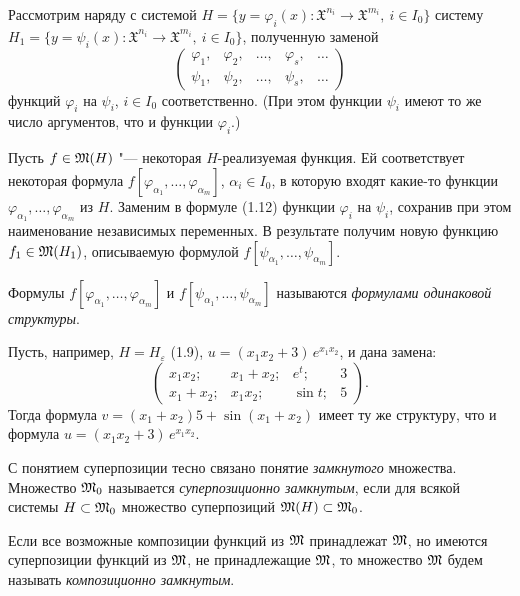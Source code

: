 Рассмотрим наряду с системой
$H=\{y=\varphi_i(x)\colon\mathfrak X^{n_i}\to\mathfrak X^{m_i},\ i\in I_0\}$
систему
$H_1=\{y=\psi_i(x)\colon\mathfrak X^{n_i}\to\mathfrak X^{m_i},\ i\in I_0\}$,
полученную заменой
\begin{equation}\tag{1.12}
\begin{pmatrix}\varphi_1,&\varphi_2,&\dots,&\varphi_s,&\dots\\ \psi_1,&\psi_2,&\dots,&\psi_s,&\dots\end{pmatrix}
\end{equation}
функций $\varphi_i$ на $\psi_i$, $i\in I_0$ соответственно. (При этом
функции $\psi_i$ имеют то же число аргументов, что и функции $\varphi_i$.)

Пусть $f\in\mathfrak M(H)$ "--- некоторая $H$-реализуемая функция. Ей соответствует
некоторая формула $f[\varphi_{\alpha_1},\dots,\varphi_{\alpha_m}]$,
$\alpha_i\in I_0$, в которую входят какие-то
функции $\varphi_{\alpha_1},\dots,\varphi_{\alpha_m}$ из $H$. Заменим
в формуле (1.12) функции $\varphi_i$ на $\psi_i$,
сохранив при этом
наименование независимых переменных. В результате получим новую функцию
$f_1\in\mathfrak M(H_1)$, описываемую формулой
$f[\psi_{\alpha_1},\dots,\psi_{\alpha_m}]$.

Формулы $f[\varphi_{\alpha_1},\dots,\varphi_{\alpha_m}]$
и $f[\psi_{\alpha_1},\dots,\psi_{\alpha_m}]$ называются \emph{формулами
одинаковой структуры}.

Пусть, например, $H=H_\varepsilon$ (1.9), $u=(x_1x_2+3)\,e^{x_1x_2}$, и дана
замена:
\[
\begin{pmatrix}x_1x_2;&x_1+x_2;&e^t;&3\\ x_1+x_2;&x_1x_2;&\sin t;&5\end{pmatrix}.
\]
Тогда формула $v=(x_1+x_2)5+\sin(x_1+x_2)$ имеет ту же структуру, что
и формула $u=(x_1x_2+3)\,e^{x_1x_2}$.

С понятием суперпозиции тесно связано понятие \emph{замкнутого}
множества. Множество $\mathfrak M_0$ называется \emph{суперпозиционно замкнутым},
если для всякой системы $H\subset\mathfrak M_0$ множество суперпозиций
$\mathfrak M(H)\subset\mathfrak M_0$.
%

Если все возможные композиции функций из $\mathfrak M$ принадлежат $\mathfrak M$, но
имеются суперпозиции функций из $\mathfrak M$, не принадлежащие $\mathfrak M$, то множество
$\mathfrak M$ будем называть \emph{композиционно замкнутым}.


